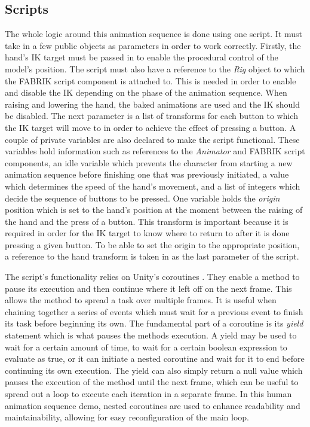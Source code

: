 \subsection{Scripts}
The whole logic around this animation sequence is done using one script. It must
take in a few public objects as parameters in order to work correctly. Firstly,
the hand's IK target must be passed in to enable the procedural control of the
model's position. The script must also have a reference to the \textit{Rig}
object to which the FABRIK script component is attached to. This is needed in
order to enable and disable the IK depending on the phase of the animation
sequence. When raising and lowering the hand, the baked animations are used and
the IK should be disabled. The next parameter is a list of transforms for each
button to which the IK target will move to in order to achieve the effect of
pressing a button. A couple of private variables are also declared to make the
script functional. These variables hold information such as references to the
\textit{Animator} and FABRIK script components, an idle variable which prevents the
character from starting a new animation sequence before finishing one that was
previously initiated, a value which determines the speed of the hand's movement,
and a list of integers which decide the sequence of buttons to be pressed. One
variable holds the \textit{origin} position which is set to the hand's
position at the moment between the raising of the hand and the press of
a button. This transform is important because it is required in order for the IK
target to know where to return to after it is done pressing a given button. To
be able to set the origin to the appropriate position, a reference to the hand
transform is taken in as the last parameter of the script.

The script's functionality relies on Unity's coroutines \cite{unity_coroutines}.
They enable a method to pause its execution and then continue where it left off
on the next frame. This allows the method to spread a task over multiple frames.
It is useful when chaining together a series of events which must wait for
a previous event to finish its task before beginning its own. The fundamental
part of a coroutine is its \textit{yield} statement which is what pauses the
methods execution. A yield may be used to wait for a certain amount of time, to
wait for a certain boolean expression to evaluate as true, or it can initiate
a nested coroutine and wait for it to end before continuing its own execution.
The yield can also simply return a null value which pauses the execution of the
method until the next frame, which can be useful to spread out a loop to execute
each iteration in a separate frame. In this human animation sequence demo,
nested coroutines are used to enhance readability and maintainability, allowing
for easy reconfiguration of the main loop. 


